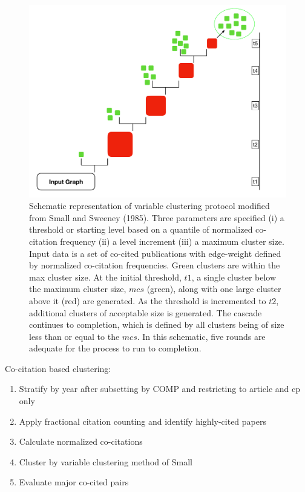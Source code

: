 \begin{figure}[ht]
\centering
  \includegraphics[scale=0.25]{vlc.pdf}
\caption{Schematic representation of variable clustering protocol modified from Small and Sweeney (1985). Three parameters are specified (i) a threshold or starting level based on a quantile of normalized co-citation frequency (ii) a level increment (iii) a maximum cluster size. Input data is a set of co-cited publications with edge-weight defined by normalized co-citation frequencies. Green clusters are within the max cluster size. At the initial threshold, $t1$, a single cluster below the maximum cluster size, $mcs$ (green), along with one large cluster above it (red) are generated. As the threshold is incremented to $t2$, additional clusters of acceptable size is generated. The cascade continues to completion, which is defined by all clusters being of size less than or equal to the $mcs$. In this schematic, five rounds are adequate for the process to run to completion.}
\label{vlc_process}       %
\end{figure}

\noindent
Co-citation based clustering:
\begin{enumerate}
\item Stratify by year after subsetting by COMP and restricting to article and cp only
\item Apply fractional citation counting and identify highly-cited papers
\item Calculate normalized co-citations
\item Cluster by variable clustering method of Small
\item Evaluate major co-cited pairs
\end{enumerate}



